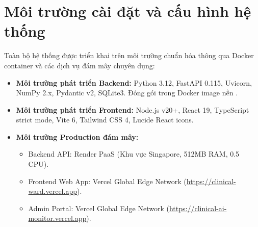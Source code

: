 \section{Môi trường cài đặt và cấu hình hệ thống}
\label{sec:environment_setup}

Toàn bộ hệ thống được triển khai trên môi trường chuẩn hóa thông qua Docker container và các dịch vụ đám mây chuyên dụng:

\begin{itemize}[leftmargin=1.5em]
    \item \textbf{Môi trường phát triển Backend:} Python 3.12, FastAPI 0.115, Uvicorn, NumPy 2.x, Pydantic v2, SQLite3. Đóng gói trong Docker image nền .
    \item \textbf{Môi trường phát triển Frontend:} Node.js v20+, React 19, TypeScript strict mode, Vite 6, Tailwind CSS 4, Lucide React icons.
    \item \textbf{Môi trường Production đám mây:}
    \begin{itemize}
        \item Backend API: Render PaaS (Khu vực Singapore, 512MB RAM, 0.5 CPU).
        \item Frontend Web App: Vercel Global Edge Network (\url{https://clinical-ward.vercel.app}).
        \item Admin Portal: Vercel Global Edge Network (\url{https://clinical-ai-monitor.vercel.app}).
    \end{itemize}
\end{itemize}
